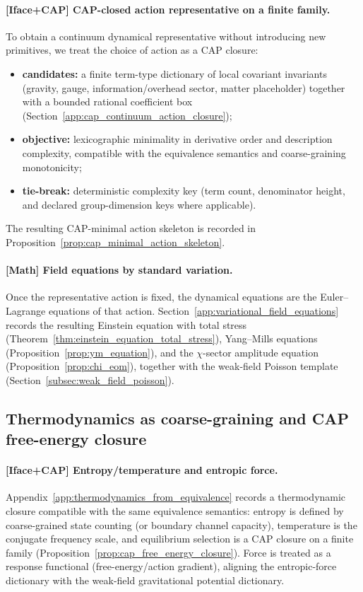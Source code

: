 \paragraph{[Iface+CAP] CAP-closed action representative on a finite family.}
To obtain a continuum dynamical representative without introducing new primitives, we treat the choice of action as a CAP closure:
\begin{itemize}
\item \textbf{candidates:} a finite term-type dictionary of local covariant invariants (gravity, gauge, information/overhead sector, matter placeholder) together with a bounded rational coefficient box (Section~\ref{app:cap_continuum_action_closure});
\item \textbf{objective:} lexicographic minimality in derivative order and description complexity, compatible with the equivalence semantics and coarse-graining monotonicity;
\item \textbf{tie-break:} deterministic complexity key (term count, denominator height, and declared group-dimension keys where applicable).
\end{itemize}
The resulting CAP-minimal action skeleton is recorded in Proposition~\ref{prop:cap_minimal_action_skeleton}.

\paragraph{[Math] Field equations by standard variation.}
Once the representative action is fixed, the dynamical equations are the Euler--Lagrange equations of that action.
Section~\ref{app:variational_field_equations} records the resulting Einstein equation with total stress (Theorem~\ref{thm:einstein_equation_total_stress}), Yang--Mills equations (Proposition~\ref{prop:ym_equation}), and the $\chi$-sector amplitude equation (Proposition~\ref{prop:chi_eom}), together with the weak-field Poisson template (Section~\ref{subsec:weak_field_poisson}).

\subsection{Thermodynamics as coarse-graining and CAP free-energy closure}
\label{subsec:tick_cap_thermo}

\paragraph{[Iface+CAP] Entropy/temperature and entropic force.}
Appendix~\ref{app:thermodynamics_from_equivalence} records a thermodynamic closure compatible with the same equivalence semantics:
entropy is defined by coarse-grained state counting (or boundary channel capacity), temperature is the conjugate frequency scale, and equilibrium selection is a CAP closure on a finite family (Proposition~\ref{prop:cap_free_energy_closure}).
Force is treated as a response functional (free-energy/action gradient), aligning the entropic-force dictionary with the weak-field gravitational potential dictionary.

